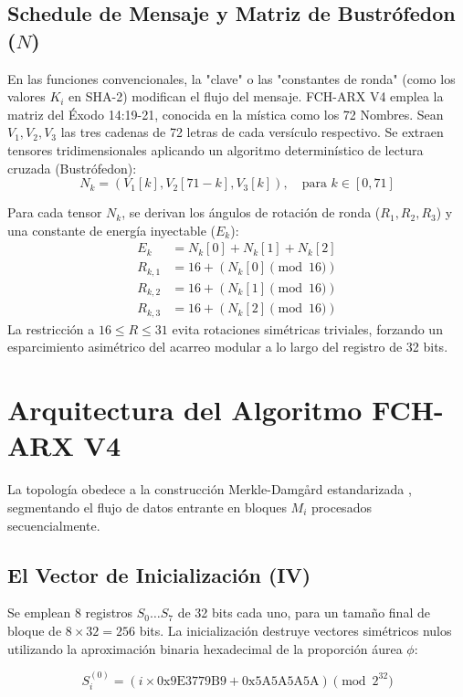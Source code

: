 \documentclass[10pt,journal,compsoc]{IEEEtran}
\begin{document}
\subsection{Schedule de Mensaje y Matriz de Bustrófedon ($N$)}
En las funciones convencionales, la "clave" o las "constantes de ronda" (como los valores $K_i$ en SHA-2) modifican el flujo del mensaje. FCH-ARX V4 emplea la matriz del Éxodo 14:19-21, conocida en la mística como los 72 Nombres.
Sean $V_1, V_2, V_3$ las tres cadenas de 72 letras de cada versículo respectivo. Se extraen tensores tridimensionales aplicando un algoritmo determinístico de lectura cruzada (Bustrófedon):
\begin{equation}
N_k = \left( V_1[k], V_2[71 - k], V_3[k] \right), \quad \text{para } k \in [0, 71]
\end{equation}

Para cada tensor $N_k$, se derivan los ángulos de rotación de ronda ($R_1, R_2, R_3$) y una constante de energía inyectable ($E_k$):
\begin{align}
E_k &= N_k[0] + N_k[1] + N_k[2] \\
R_{k,1} &= 16 + (N_k[0] \pmod{16}) \\
R_{k,2} &= 16 + (N_k[1] \pmod{16}) \\
R_{k,3} &= 16 + (N_k[2] \pmod{16})
\end{align}
La restricción a $16 \leq R \leq 31$ evita rotaciones simétricas triviales, forzando un esparcimiento asimétrico del acarreo modular a lo largo del registro de 32 bits.

\section{Arquitectura del Algoritmo FCH-ARX V4}

La topología obedece a la construcción Merkle-Damgård estandarizada \cite{damgard1989design}, segmentando el flujo de datos entrante en bloques $M_i$ procesados secuencialmente.

\subsection{El Vector de Inicialización (IV)}
Se emplean 8 registros $S_0 \dots S_7$ de 32 bits cada uno, para un tamaño final de bloque de $8 \times 32 = 256$ bits. La inicialización destruye vectores simétricos nulos utilizando la aproximación binaria hexadecimal de la proporción áurea $\phi$:

\begin{equation}
S_i^{(0)} = \left(i \times \text{0x9E3779B9} + \text{0x5A5A5A5A}\right) \pmod{2^{32}}
\end{equation}
\end{document}
